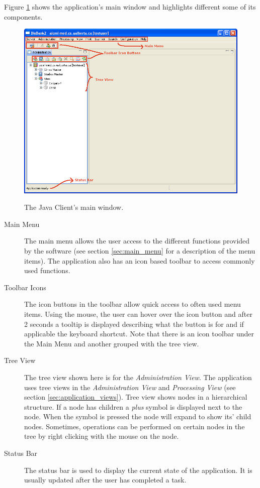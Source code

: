 Figure \ref{fig:main_window} shows the application's main window and highlights
different some of its components.
    \begin{figure}[H]
      \centering
      \scalebox{0.4}
      { \includegraphics*{screenshots/overview/main_window} }
      \caption{The Java Client's main window.}
      \label{fig:main_window}
    \end{figure}
\begin{description}
  \item[Main Menu] The main menu allows the user access to the different
    functions provided by the software (see section \ref{sec:main_menu} for a
    description of the menu items). The application also has an icon based
    toolbar to access commonly used functions.
  \item[Toolbar Icons] The icon buttons in the toolbar allow quick access to
    often used menu items. Using the mouse, the user can hover over the icon
    button and after 2 seconds a tooltip is displayed describing what the
    button is for and if applicable the keyboard shortcut. Note that there is
    an icon toolbar under the Main Menu and another grouped with the tree view.
  \item[Tree View] The tree view shown here is for the \emph{Administration
    View}. The application uses tree views in the \emph{Administration View}
    and \emph{Processing View} (see section \ref{sec:application_views}). Tree
    view shows nodes in a hierarchical structure. If a node has children a
    \emph{plus} symbol is displayed next to the node. When the symbol is
    pressed the node will expand to show its' child nodes.  Sometimes,
    operations can be performed on certain nodes in the tree by right clicking
    with the mouse on the node.
  \item[Status Bar] The status bar is used to display the current state of the
    application. It is usually updated after the user has completed a task.
\end{description}

